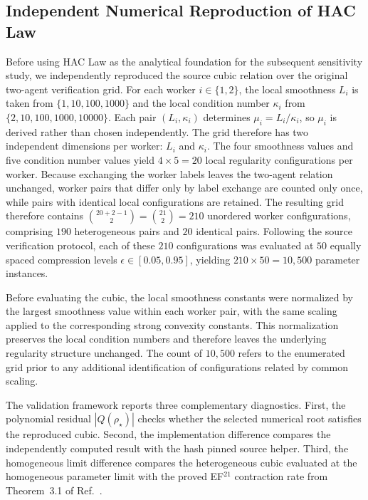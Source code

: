 \documentclass[mathematics,article,submit,moreauthors]{Definitions/mdpi}
\begin{document}
\subsection{Independent Numerical Reproduction of HAC Law}
Before using HAC Law as the analytical foundation for the subsequent sensitivity study, we independently reproduced the source cubic relation over the original two-agent verification grid. For each worker $i\in\{1,2\}$, the local smoothness $L_i$ is taken from $\{1,10,100,1000\}$ and the local condition number $\kappa_i$ from $\{2,10,100,1000,10000\}$.
Each pair $(L_i,\kappa_i)$ determines $\mu_i=L_i/\kappa_i$, so $\mu_i$ is derived rather than chosen independently.
The grid therefore has two independent dimensions per worker: $L_i$ and $\kappa_i$. The four smoothness values and five condition number values yield $4 \times 5 = 20$ local regularity configurations per worker. Because exchanging the worker labels leaves the two-agent relation unchanged, worker pairs that differ only by label exchange are counted only once, while pairs with identical local configurations are retained. The resulting grid therefore contains \(\binom{20+2-1}{2}=\binom{21}{2}=210\) unordered worker configurations, comprising \(190\) heterogeneous pairs and \(20\) identical pairs. Following the source verification protocol, each of these \(210\) configurations was evaluated at \(50\) equally spaced compression levels \(\epsilon\in[0.05,0.95]\), yielding \(210\times50=10{,}500\) parameter instances.

Before evaluating the cubic, the local smoothness constants were normalized by the largest smoothness value within each worker pair, with the same scaling applied to the corresponding strong convexity constants. This normalization preserves the local condition numbers and therefore leaves the underlying regularity structure unchanged. The count of \(10{,}500\) refers to the enumerated grid prior to any additional identification of configurations related by common scaling.

The validation framework reports three complementary diagnostics. First, the polynomial residual \(|Q(\rho_\star)|\) checks whether the selected numerical root satisfies the reproduced cubic. Second, the implementation difference compares the independently computed result with the hash pinned source helper. Third, the homogeneous limit difference compares the heterogeneous cubic evaluated at the homogeneous parameter limit with the proved EF$^{21}$ contraction rate from Theorem~3.1 of Ref.~\cite{thomsen2026tight}.
\end{document}
